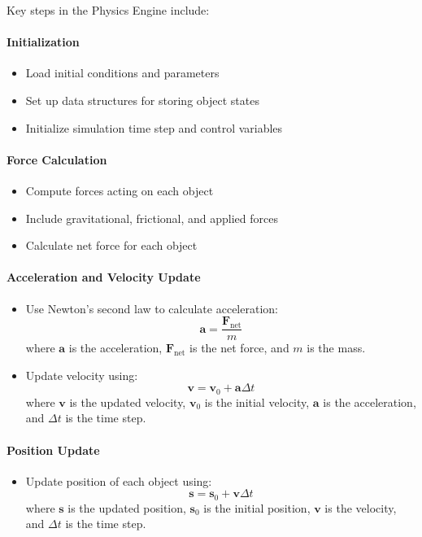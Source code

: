 Key steps in the Physics Engine include:

\paragraph{Initialization}
\begin{itemize}
    \item Load initial conditions and parameters
    \item Set up data structures for storing object states
    \item Initialize simulation time step and control variables
\end{itemize}

\paragraph{Force Calculation}
\begin{itemize}
    \item Compute forces acting on each object
    \item Include gravitational, frictional, and applied forces
    \item Calculate net force for each object
\end{itemize}

\paragraph{Acceleration and Velocity Update}
\begin{itemize}
    \item Use Newton's second law to calculate acceleration:
    \begin{equation}
        \mathbf{a} = \frac{\mathbf{F}_{\text{net}}}{m}
    \end{equation}
    where \(\mathbf{a}\) is the acceleration, \(\mathbf{F}_{\text{net}}\) is the net force, and \(m\) is the mass.
    \item Update velocity using:
    \begin{equation}
        \mathbf{v} = \mathbf{v}_0 + \mathbf{a} \Delta t
    \end{equation}
    where \(\mathbf{v}\) is the updated velocity, \(\mathbf{v}_0\) is the initial velocity, \(\mathbf{a}\) is the acceleration, and \(\Delta t\) is the time step.
\end{itemize}

\paragraph{Position Update}
\begin{itemize}
    \item Update position of each object using:
    \begin{equation}
        \mathbf{s} = \mathbf{s}_0 + \mathbf{v} \Delta t
    \end{equation}
    where \(\mathbf{s}\) is the updated position, \(\mathbf{s}_0\) is the initial position, \(\mathbf{v}\) is the velocity, and \(\Delta t\) is the time step.
\end{itemize}

